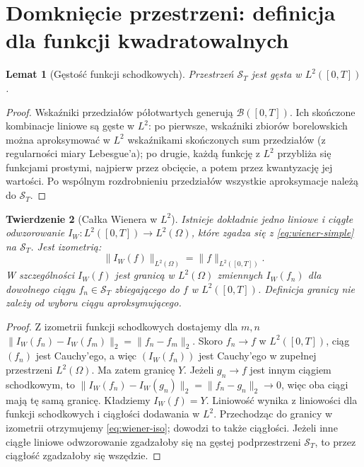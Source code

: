 \documentclass[11pt,a4paper,oneside]{report}
\numberwithin{equation}{chapter}
\theoremstyle{plain}
\newtheorem{twierdzenie}{Twierdzenie}[chapter]
\newtheorem{lemat}[twierdzenie]{Lemat}
\theoremstyle{definition}
\theoremstyle{remark}
\newcommand{\calB}{\mathcal{B}}
\newcommand{\calS}{\mathcal{S}}
\newcommand{\norm}[1]{\lVert #1\rVert}
\begin{document}
\section{Domknięcie przestrzeni: definicja dla funkcji kwadratowalnych}\label{sec:volIII:01:03}
\begin{lemat}[Gęstość funkcji schodkowych]\label{lem:volIII:01:02}
Przestrzeń $\calS_T$ jest gęsta w $L^2([0,T])$.
\end{lemat}
\begin{proof}
Wskaźniki przedziałów półotwartych generują $\calB([0,T])$.
Ich skończone kombinacje liniowe są gęste w $L^2$:
po pierwsze, wskaźniki zbiorów borelowskich można
aproksymować w $L^2$ wskaźnikami skończonych sum przedziałów
(z regularności miary Lebesgue'a); po drugie,
każdą funkcję z $L^2$ przybliża się funkcjami prostymi,
najpierw przez obcięcie, a potem przez kwantyzację jej wartości.
Po wspólnym rozdrobnieniu przedziałów wszystkie aproksymacje
należą do $\calS_T$.
\end{proof}

\begin{twierdzenie}[Całka Wienera w $L^2$]\label{thm:volIII:01:02}\label{th:wiener-extension}
Istnieje dokładnie jedno liniowe i ciągłe odwzorowanie
$I_W:L^2([0,T])\to L^2(\Omega)$, które zgadza się z
\eqref{eq:wiener-simple} na $\calS_T$. Jest izometrią:
\[
\norm{I_W(f)}_{L^2(\Omega)}=\norm{f}_{L^2([0,T])}.
\tag{1.3}\label{eq:wiener-iso}
\]
W szczególności $I_W(f)$ jest granicą w $L^2(\Omega)$
zmiennych $I_W(f_n)$ dla dowolnego ciągu $f_n\in\calS_T$
zbiegającego do $f$ w $L^2([0,T])$. Definicja granicy
nie zależy od wyboru ciągu aproksymującego.
\end{twierdzenie}
\begin{proof}
Z izometrii funkcji schodkowych dostajemy dla $m,n$
$\norm{I_W(f_n)-I_W(f_m)}_2=\norm{f_n-f_m}_2$.
Skoro $f_n\to f$ w $L^2([0,T])$, ciąg $(f_n)$ jest Cauchy'ego,
a więc $(I_W(f_n))$ jest Cauchy'ego w zupełnej przestrzeni
$L^2(\Omega)$. Ma zatem granicę $Y$. Jeżeli $g_n\to f$
jest innym ciągiem schodkowym, to
$\norm{I_W(f_n)-I_W(g_n)}_2=\norm{f_n-g_n}_2\to0$,
więc oba ciągi mają tę samą granicę. Kładziemy $I_W(f)=Y$.
Liniowość wynika z liniowości dla funkcji schodkowych i
ciągłości dodawania w $L^2$. Przechodząc do granicy w izometrii
otrzymujemy \eqref{eq:wiener-iso}; dowodzi to także ciągłości.
Jeżeli inne ciągłe liniowe odwzorowanie zgadzałoby się na gęstej
podprzestrzeni $\calS_T$, to przez ciągłość zgadzałoby się
wszędzie.
\end{proof}
\end{document}
